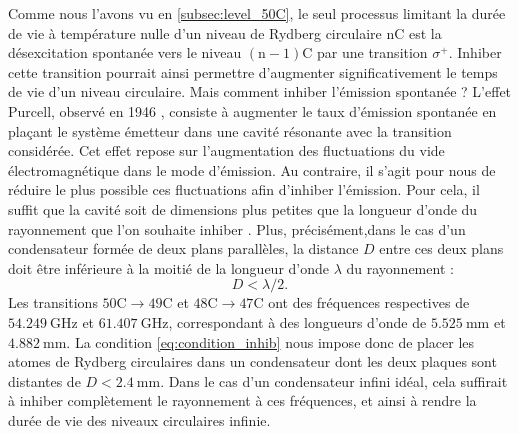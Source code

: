 Comme nous l'avons vu en \ref{subsec:level_50C}, le seul processus limitant la durée de vie à température nulle d'un niveau de Rydberg circulaire $\mathrm{nC}$ est la désexcitation spontanée vers le niveau $\mathrm{(n-1)C}$ par une transition $\sigma^+$.
Inhiber cette transition pourrait ainsi permettre d'augmenter significativement le temps de vie d'un niveau circulaire.
Mais comment inhiber l'émission spontanée ?
L'effet Purcell, observé en 1946 \cite{Purcell46_Purcelleffect}, consiste à augmenter le taux d'émission spontanée en plaçant le système émetteur dans une cavité résonante avec la transition considérée.
Cet effet repose sur l'augmentation des fluctuations du vide électromagnétique dans le mode d'émission.
Au contraire, il s'agit pour nous de réduire le plus possible ces fluctuations afin d'inhiber l'émission.
Pour cela, il suffit que la cavité soit de dimensions plus petites que la longueur d'onde du rayonnement que l'on souhaite inhiber \cite{MX_KELPPNER_INHIBITION,MX_KLEPPNERINHIBITION85}.
Plus, précisément,dans le cas d'un condensateur formée de deux plans parallèles, la distance $D$ entre ces deux plans doit être inférieure à la moitié de la longueur d'onde $\lambda$ du rayonnement :
%
\begin{equation}
\label{eq:condition_inhib}
D< \lambda/2.
\end{equation}
%
Les transitions $\mathrm{50C}\rightarrow \mathrm{49C}$ et $\mathrm{48C}\rightarrow \mathrm{47C}$ ont des fréquences respectives de $\SI{54.249}{\GHz}$ et $\SI{61.407}{\GHz}$, correspondant à des longueurs d'onde de $\SI{5.525}{\mm}$ et $\SI{4.882}{\mm}$.
La condition \eqref{eq:condition_inhib} nous impose donc de placer les atomes de Rydberg circulaires dans un condensateur dont les deux plaques sont distantes de $D<\SI{2.4}{\mm}$.
Dans le cas d'un condensateur infini idéal, cela suffirait à inhiber complètement le rayonnement à ces fréquences, et ainsi à rendre la durée de vie des niveaux circulaires infinie.

